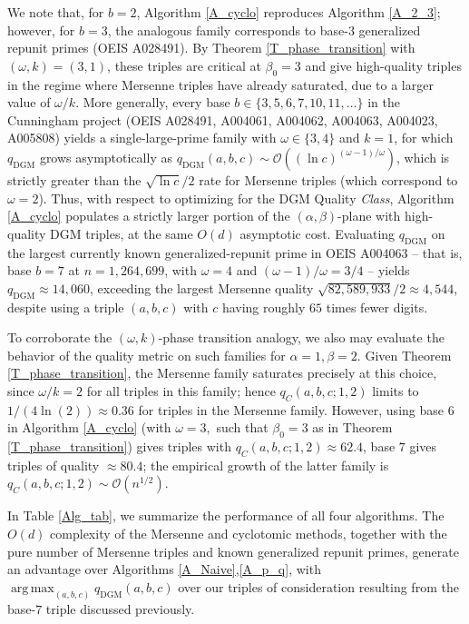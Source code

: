\documentclass[11pt,letterpaper]{amsart}
\begin{document}
We note that, for $b = 2$, Algorithm \ref{A_cyclo} reproduces Algorithm \ref{A_2_3};
however, for $b = 3$, the analogous family corresponds to base-3 generalized repunit
primes (OEIS A028491). By Theorem \ref{T_phase_transition} with $(\omega,k)=(3,1)$,
these triples are critical at $\beta_0=3$ and give high-quality triples in the
regime where Mersenne triples have already saturated, due to a larger value of
$\omega/k$. More generally, every base $b\in\{3,5,6,7,10,11,\dots\}$ in the Cunningham
project (OEIS A028491, A004061, A004062, A004063, A004023, A005808) yields a
single-large-prime family with $\omega\in\{3,4\}$ and $k=1$, for which $q_{\mathrm{DGM}}$
grows asymptotically as $ q_{\mathrm{DGM}}(a, b, c) \sim \mathcal{O}((\ln c)^{(\omega-1)/\omega})$, which is strictly greater than the $\sqrt{\ln c}/2$ rate for Mersenne triples (which correspond to $\omega = 2$).
Thus, with respect to optimizing for the DGM Quality \textit{Class}, Algorithm
\ref{A_cyclo} populates a strictly larger portion of the $(\alpha,\beta)$-plane with
high-quality DGM triples, at the same $O(d)$ asymptotic cost. Evaluating
$q_{\mathrm{DGM}}$ on the largest currently known generalized-repunit prime in OEIS
A004063 – that is, base $b=7$ at $n=1{,}264{,}699$, with $\omega=4$ and $(\omega-1)/\omega = 3/4$ –
yields $q_{\mathrm{DGM}}\approx 14{,}060$, exceeding the largest Mersenne quality
$\sqrt{82{,}589{,}933}/2 \approx 4{,}544$, despite using a triple $(a, b, c)$ with $c$ having roughly $65$ times fewer digits.

To corroborate the $(\omega, k)$-phase transition analogy, we also may evaluate the behavior of the quality metric on such families for $\alpha = 1, \beta = 2$. Given Theorem \ref{T_phase_transition}, the Mersenne family saturates precisely at this choice, since $\omega/k = 2$ for all triples in this family; hence $q_C(a, b, c; 1, 2)$ limits to $1/(4 \ln(2)) \approx 0.36$ for triples in the Mersenne family. However, using base $6$ in Algorithm \ref{A_cyclo} (with $\omega = 3,$ such that $\beta_0 = 3$ as in Theorem \ref{T_phase_transition}) gives triples with $q_C(a, b, c; 1, 2) \approx 62.4$, base $7$ gives triples of quality $\approx 80.4$; the empirical growth of the latter family is $q_C(a, b, c; 1, 2) \sim \mathcal{O}(n^{1/2})$. 

In Table \ref{Alg_tab}, we summarize the performance of all four algorithms. The $O(d)$ complexity of the Mersenne and cyclotomic methods, together with the pure number of Mersenne triples and known generalized repunit primes, generate an advantage over Algorithms \ref{A_Naive},\ref{A_p_q}, with $\operatorname*{arg\,max}_{(a, b, c)} q_{\text{DGM}} (a, b, c)$ over our triples of consideration resulting from the base-$7$ triple discussed previously. 
\end{document}
